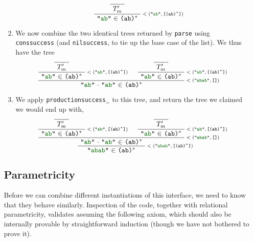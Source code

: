 \documentclass[preprint]{sigplanconf}
\newcommand{\str}[1]{\texttt{"\textcolor{DarkGreen}{#1}"}}
\newcommand{\regex}[1]{\texttt{#1}}
\newcommand{\fname}[1]{\texttt{#1}}
\newcommand{\nil}{\texttt{[]}}
\newcommand{\llstrcat}[2]{#1 \ensuremath{\cdot} #2}
\newcommand{\minparsetreeannot}[2]{\ensuremath{<(#1,#2)}}
\newcommand{\valuelist}[1]{\texttt{[}#1\texttt{]}}
\def\_{\textunderscore}
\begin{document}
\begin{enumerate}
\begin{enumerate}
            \[
              \AxiomC{}\UnaryInfC{$T'_m$}
              \RightLabel{\scriptsize\minparsetreeannot{\str{ab}}{\valuelist{\regex{(ab)$^*$}}}}
              \UnaryInfC{\str{ab} $\in$ \regex{(ab)$^*$}}
            \DisplayProof
            \]
        \end{enumerate}
      \item
        We now combine the two identical trees returned by \fname{parse} using \fname{cons\_success} (and \fname{nil\_success}, to tie up the base case of the list).  We thus have the tree
        \[
          \AxiomC{}\UnaryInfC{$T'_m$}
          \RightLabel{\scriptsize\minparsetreeannot{\str{ab}}{\valuelist{\regex{(ab)$^*$}}}}
          \UnaryInfC{\str{ab} $\in$ \regex{(ab)$^*$}}
          \AxiomC{}\UnaryInfC{$T'_m$}
          \RightLabel{\scriptsize\minparsetreeannot{\str{ab}}{\valuelist{\regex{(ab)$^*$}}}}
          \UnaryInfC{\str{ab} $\in$ \regex{(ab)$^*$}}
          \RightLabel{\scriptsize\minparsetreeannot{\str{abab}}{\nil}}
          \BinaryInfC{\llstrcat{\str{ab}}{\str{ab}} $\in$ \regex{(ab)$^*$}}
        \DisplayProof
        \]
      \item
        We apply \fname{production\_success$_=$} to this tree, and return the tree we claimed we would end up with,
        \[
          \AxiomC{}\UnaryInfC{$T'_m$}
          \RightLabel{\scriptsize\minparsetreeannot{\str{ab}}{\valuelist{\regex{(ab)$^*$}}}}
          \UnaryInfC{\str{ab} $\in$ \regex{(ab)$^*$}}
          \AxiomC{}\UnaryInfC{$T'_m$}
          \RightLabel{\scriptsize\minparsetreeannot{\str{ab}}{\valuelist{\regex{(ab)$^*$}}}}
          \UnaryInfC{\str{ab} $\in$ \regex{(ab)$^*$}}
          \RightLabel{\scriptsize\minparsetreeannot{\str{abab}}{\nil}}
          \BinaryInfC{\llstrcat{\str{ab}}{\str{ab}} $\in$ \regex{(ab)$^*$}}
          \RightLabel{\scriptsize\minparsetreeannot{\str{abab}}{\valuelist{\regex{(ab)$^*$}}}}
          \UnaryInfC{\str{abab} $\in$ \regex{(ab)$^*$}}
        \DisplayProof
        \]
    \end{enumerate}

  \subsection{Parametricity} \label{sec:parser-extensionality-theorem}
    Before we can combine different instantiations of this interface, we need to know that they behave similarly.  Inspection of the code, together with relational parametricity, validates assuming the following axiom, which should also be internally provable by straightforward induction (though we have not bothered to prove it).
\end{document}
